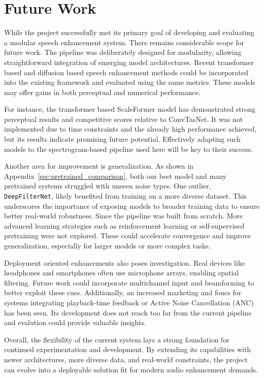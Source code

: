 \chapter{Future Work}
\label{chap:future_work}

While the project successfully met its primary goal of developing and evaluating a modular speech enhancement system. There remains considerable scope for future work. The pipeline was deliberately designed for modularity, allowing straightforward integration of emerging model architectures. Recent transformer based and diffusion based speech enhancement methods could be incorporated into the existing framework and evaluated using the same metrics. These models may offer gains in both perceptual and numerical performance.

For instance, the transformer based ScaleFormer model \cite{wu2023scaleformer} has demonstrated strong perceptual results and competitive scores relative to ConvTasNet. It was not implemented due to time constraints and the already high performance achieved, but its results indicate promising future potential. Effectively adapting such models to the spectrogram-based pipeline used here will be key to their success.

Another area for improvement is generalization. As shown in Appendix~\ref{sec:pretrained_comparison}, both our best model and many pretrained systems struggled with unseen noise types. One outlier, \texttt{DeepFilterNet}, likely benefited from training on a more diverse dataset. This underscores the importance of exposing models to broader training data to ensure better real-world robustness. Since the pipeline was built from scratch. More advanced learning strategies such as reinforcement learning or self-supervised pretraining were not explored. These could accelerate convergence and improve generalization, especially for larger models or more complex tasks.

Deployment oriented enhancements also poses investigation. Real devices like headphones and smartphones often use microphone arrays, enabling spatial filtering. Future work could incorporate multichannel input and beamforming to better exploit these cues. Additionally, an increased marketing and foucs for systems integrating playback-time feedback or Active Noise Cancellation (ANC) has been seen. Its development does not reach too far from the current pipeline and evalution could provide valuable insights.

Overall, the flexibility of the current system lays a strong foundation for continued experimentation and development. By extending its capabilities with newer architectures, more diverse data, and real-world constraints, the project can evolve into a deployable solution fit for modern audio enhancement demands.


